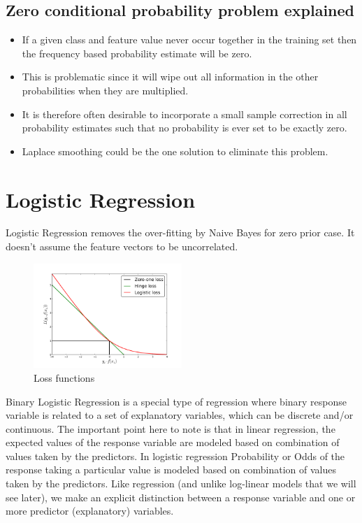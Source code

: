 \subsection{Zero conditional probability problem explained}
\begin{itemize}
    \item If a given class and feature value never occur together in the training set then the frequency based probability estimate will be zero.
    \item This is problematic since it will wipe out all information in the other probabilities when they are multiplied.
    \item It is therefore often desirable to incorporate a small sample correction in all probability estimates such that no probability is ever set to be exactly zero.
    \item Laplace smoothing could be the one solution to eliminate this problem.
\end{itemize}

\section{Logistic Regression}

Logistic Regression removes the over-fitting by Naive Bayes for zero prior case. It doesn't assume the feature vectors to be uncorrelated.

\begin{figure}[H]
  \begin{center}
    \includegraphics[width=0.5\textwidth]{loss_functions.png}
    \caption{
      Loss functions}
  \end{center}
\end{figure}

Binary Logistic Regression is a special type of regression where binary response variable is related to a set of explanatory variables, which can be discrete and/or continuous. The important point here to note is that in linear regression, the expected values of the response variable are modeled based on combination of values taken by the predictors. In logistic regression Probability or Odds of the response taking a particular value is modeled based on combination of values taken by the predictors. Like regression (and unlike log-linear models that we will see later), we make an explicit distinction between a response variable and one or more predictor (explanatory) variables.

